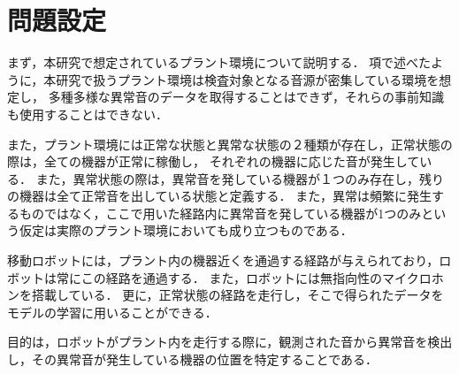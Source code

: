 \documentclass[../main]{subfiles}
\begin{document}
\section{問題設定}
\label{sec:problem_setting}
まず，本研究で想定されているプラント環境について説明する．
項で述べたように，本研究で扱うプラント環境は検査対象となる音源が密集している環境を想定し，
多種多様な異常音のデータを取得することはできず，それらの事前知識も使用することはできない．

また，プラント環境には正常な状態と異常な状態の２種類が存在し，正常状態の際は，全ての機器が正常に稼働し，
それぞれの機器に応じた音が発生している．
また，異常状態の際は，異常音を発している機器が１つのみ存在し，残りの機器は全て正常音を出している状態と定義する．
また，異常は頻繁に発生するものではなく，ここで用いた経路内に異常音を発している機器が1つのみという仮定は実際のプラント環境においても成り立つものである．

移動ロボットには，プラント内の機器近くを通過する経路が与えられており，ロボットは常にこの経路を通過する．
また，ロボットには無指向性のマイクロホンを搭載している．
更に，正常状態の経路を走行し，そこで得られたデータをモデルの学習に用いることができる．

目的は，ロボットがプラント内を走行する際に，観測された音から異常音を検出し，その異常音が発生している機器の位置を特定することである．
\end{document}
